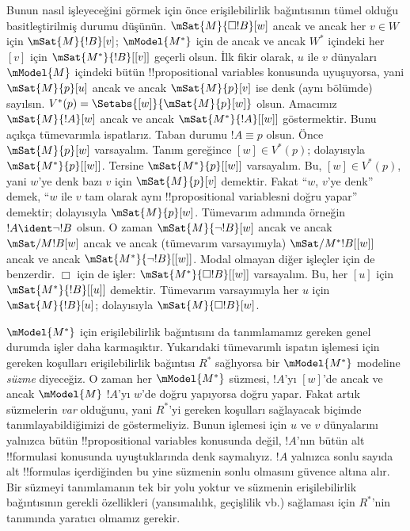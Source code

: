  Bunun nasıl işleyeceğini görmek için önce erişilebilirlik bağıntısının
  tümel olduğu basitleştirilmiş durumu düşünün. $\mSat{M}{\Box!B}[w]$ ancak
  ve ancak her $v\in W$ için $\mSat{M}{!B}[v]$; $\mModel{M^*}$ için de ancak
  ve ancak $W^*$ içindeki her $[v]$ için $\mSat{M^*}{!B}[{[v]}]$ geçerli olsun. İlk
  fikir olarak, $u$ ile $v$ dünyaları $\mModel{M}$ içindeki
bütün !!{propositional variable}s konusunda uyuşuyorsa, yani
$\mSat{M}{p}[u]$ ancak ve ancak $\mSat{M}{p}[v]$ ise denk (aynı bölümde)
sayılsın. $V^*(p)=\Setabs{[w]}{\mSat{M}{p}[w]}$ olsun. Amacımız
$\mSat{M}{!A}[w]$ ancak ve ancak $\mSat{M^*}{!A}[{[w]}]$ göstermektir.
Bunu açıkça tümevarımla ispatlarız. Taban durumu $!A\equiv p$ olsun. Önce
  $\mSat{M}{p}[w]$ varsayalım. Tanım gereğince $[w]\in V^*(p)$; dolayısıyla
$\mSat{M^*}{p}[{[w]}]$. Tersine $\mSat{M^*}{p}[{[w]}]$ varsayalım. Bu,
$[w]\in V^*(p)$, yani $w$'ye denk bazı $v$ için $\mSat{M}{p}[v]$ demektir.
Fakat ``$w$, $v$'ye denk'' demek, ``$w$ ile $v$ tam olarak aynı
!!{propositional variable}s{}ni doğru yapar'' demektir; dolayısıyla
$\mSat{M}{p}[w]$. Tümevarım adımında örneğin $!A\ident\lnot!B$ olsun.
O zaman $\mSat{M}{\lnot!B}[w]$ ancak ve ancak $\mSat/{M}{!B}[w]$ ancak ve
ancak (tümevarım varsayımıyla) $\mSat/{M^*}{!B}[{[w]}]$ ancak ve ancak
$\mSat{M^*}{\lnot!B}[{[w]}]$. Modal olmayan diğer işleçler için de
benzerdir. $\Box$ için de işler: $\mSat{M^*}{\Box!B}[{[w]}]$ varsayalım.
Bu, her $[u]$ için $\mSat{M^*}{!B}[{[u]}]$ demektir. Tümevarım
varsayımıyla her $u$ için $\mSat{M}{!B}[u]$; dolayısıyla
$\mSat{M}{\Box!B}[w]$.

$\mModel{M^*}$ için erişilebilirlik bağıntısını da tanımlamamız gereken
genel durumda işler daha karmaşıktır. Yukarıdaki tümevarımlı ispatın
işlemesi için gereken koşulları erişilebilirlik bağıntısı $R^*$ sağlıyorsa
bir $\mModel{M^*}$ modeline \emph{süzme} diyeceğiz. O zaman her
$\mModel{M^*}$ süzmesi, $!A$'yı $[w]$'de ancak ve ancak $\mModel{M}$
$!A$'yı $w$'de doğru yapıyorsa doğru yapar. Fakat artık süzmelerin
\emph{var} olduğunu, yani $R^*$'yi gereken koşulları sağlayacak biçimde
  tanımlayabildiğimizi de göstermeliyiz. Bunun işlemesi için $u$ ve $v$ dünyalarını
yalnızca bütün !!{propositional variable}s konusunda değil, $!A$'nın bütün
alt !!{formula}s{}i konusunda uyuştuklarında denk saymalıyız. $!A$ yalnızca
sonlu sayıda alt !!{formula}s içerdiğinden bu yine süzmenin sonlu olmasını
güvence altına alır. Bir süzmeyi tanımlamanın tek bir yolu yoktur ve
süzmenin erişilebilirlik bağıntısının gerekli özellikleri (yansımalılık,
geçişlilik vb.) sağlaması için $R^*$'nin tanımında yaratıcı olmamız gerekir.

